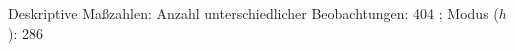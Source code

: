 				\label{tableValues:asys02_g1}
				\vspace*{-\baselineskip}
                    \begin{noten}
                	    \note{} Deskriptive Maßzahlen:
                	    Anzahl unterschiedlicher Beobachtungen: 404%
                	    ; 
                	      Modus ($h$): 286
                     \end{noten}

